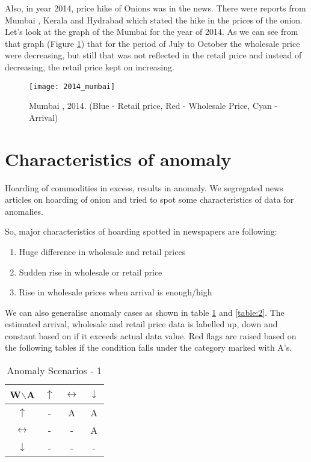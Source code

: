 Also, in year 2014, price hike of Onions was in the news. There were reports from Mumbai \cite{Onion68:online}, Kerala \cite{Keral99:online} and Hydrabad \cite{Rains78:online} which stated the hike in the prices of the onion. Let's look at the graph of the Mumbai for the year of 2014. As we can see from that graph (Figure \ref{fig:Mumbai2014}) that for the period of July to October the wholesale price were decreasing, but still that was not reflected in the retail price and instead of decreasing, the retail price kept on increasing.


\begin{figure}[here]
\begin{center}	
\texttt{[image: 2014\_mumbai]} 
\caption{Mumbai , 2014. (Blue - Retail price, Red - Wholesale Price, Cyan - Arrival)}
\label{fig:Mumbai2014}
\end{center}
\end{figure}

\section{Characteristics of anomaly}

Hoarding of commodities in excess, results in anomaly. We segregated news articles on hoarding of onion and tried to spot some characteristics of data for anomalies.

So, major characteristics of hoarding spotted in newspapers are following:

\begin{enumerate}
\item Huge difference in wholesale and retail prices
\item Sudden rise in wholesale or retail price
\item Rise in wholesale prices when arrival is enough/high
\end{enumerate}

We can also generalise anomaly cases as shown in table \ref{table:1} and \ref{table:2}. The estimated arrival, wholesale and retail price data is labelled up, down and constant based on if it exceeds actual data value. Red flags are raised based on the following tables if the condition falls under the category marked with {\color{red}A}’s.


\begin{table}
\centering
\begin{tabular}{ | c | c | c | c |}  
  \hline
  \textbf{W$\backslash$A} & \textbf{$\uparrow$} & \textbf{$\leftrightarrow$}  & \textbf{$\downarrow$} \\ \hline
  \textbf{$\uparrow$} & - & {\color{red}A} & {\color{red}A} \\ \hline
  \textbf{$\leftrightarrow$} & - & - & {\color{red}A} \\ \hline
  \textbf{$\downarrow$} & - & - & - \\ \hline
\end{tabular}
\caption{Anomaly Scenarios - 1}
\label{table:1}
\end{table}

